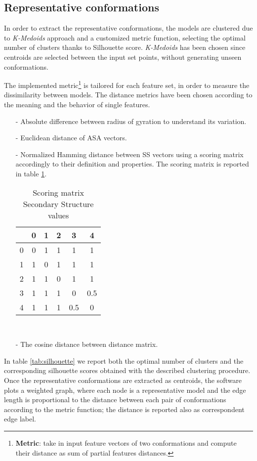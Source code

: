 \subsection{Representative conformations} 
In order to extract the representative conformations, the models are clustered due to \emph{K-Medoids} approach and a customized metric function, selecting the optimal number of clusters thanks to Silhouette score. 
\emph{K-Medoids} has been chosen since centroids are selected between the input set points, without generating unseen conformations. 

\medskip
The implemented metric\footnote{\textbf{Metric}: take in input feature vectors of two conformations and compute their distance as sum of partial features distances.} is tailored for each feature set, in order to measure the dissimilarity between models. The distance metrics have been chosen according to the meaning and the behavior of single features. %
\begin{itemize}
\item[-] Absolute difference between radius of gyration to understand its variation.
\item[-] Euclidean distance of ASA vectors.
\item[-] Normalized Hamming distance between SS vectors using a scoring matrix accordingly to their definition and properties. The scoring matrix is reported in table \ref{tab:score}. 

\begin{table}[H]
\begin{center}
\begin{tabular}{c|ccccc}
& 0 & 1 & 2 & 3 & 4 \\
\hline
0 & 0 & 1 & 1 & 1 & 1\\
1 & 1 & 0 & 1 & 1 & 1\\
2 & 1 & 1 & 0 & 1 & 1\\
3 & 1 & 1 & 1 & 0 & 0.5\\
4 & 1 & 1 & 1 & 0.5 & 0\\
\end{tabular}
\end{center}
\caption{Scoring matrix Secondary Structure values}~\label{tab:score}
\end{table}

\item[-] The cosine distance between distance matrix. 
\end{itemize}

In table \ref{tab:silhouette} we report both the optimal number of clusters and the corresponding silhouette scores obtained with the described clustering procedure. 
Once the representative conformations are extracted as centroids, the software plots a weighted graph, where each node is a representative model and the edge length is proportional to the distance between each pair of conformations according to the metric function; the distance is reported also as correspondent edge label.


